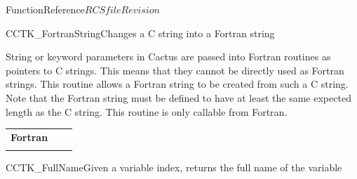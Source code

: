 \begin{cactuspart}{FunctionReference}{$RCSfile$}{$Revision$}
\begin{CCTKFunc}{CCTK\_FortranString}{Changes a C string into a Fortran string}
\label{CCTK-FortranString}
\showargs
\begin{params}
\end{params}
\begin{discussion}
String or keyword parameters in Cactus are passed into Fortran routines as
pointers to C strings. This means that they cannot be directly used as Fortran
strings. This routine allows a Fortran string to be created from such a C string. Note that the Fortran string must be defined to have at least the same expected length as the C string. This routine is only callable from Fortran.
\end{discussion}
\begin{examples}
\begin{tabular}{@{}p{3cm}cp{11cm}}
\hfill {\bf Fortran} && \\
\\
\end{tabular}
\end{examples}
\begin{errorcodes}
\end{errorcodes}
\end{CCTKFunc}




\begin{CCTKFunc}{CCTK\_FullName}{Given a variable index, returns the full name of the variable}
\label{CCTK-FullName}
\showcargs
\begin{params}
\end{params}
\begin{discussion}


\end{discussion}
\end{CCTKFunc}
\end{cactuspart}

